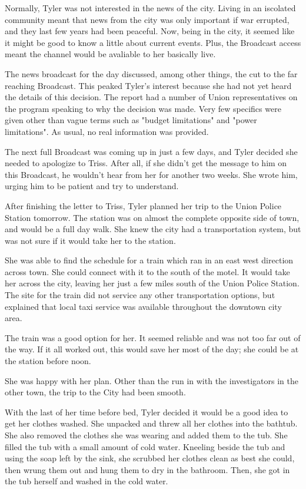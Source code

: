 \documentclass[courier]{sffms}
\begin{document}
Normally, Tyler was not interested in the news of
the city. Living in an iscolated community meant
that news from the city was only important if war
errupted, and they last few years had been peaceful.
Now, being in the city, it seemed like it might be
good to know a little about current events. Plus,
the Broadcast access meant the channel would be
avaliable to her basically live.

The news broadcast for the day discussed, among
other things, the cut to the far reaching Broadcast.
This peaked Tyler's interest because she had not
yet heard the details of this decision. The report had
a number of Union representatives on the program
speaking to why the decision was made. Very few
specifics were given other than vague terms such as
"budget limitations" and "power limitations". As
usual, no real information was provided.

The next full Broadcast was coming up in just a few
days, and Tyler decided she needed to apologize to
Triss. After all, if she didn't get the
message to him on this Broadcast, he wouldn't
hear from her for another two weeks. She wrote him,
urging him to be patient and try to understand.

After finishing the letter to Triss, Tyler planned her
trip to the Union Police Station tomorrow. The station
was on almost the complete opposite side of town,
and would be a full day walk. She knew the city had
a transportation system, but was not sure if it would
take her to the station.

She was able to find the schedule for a train which
ran in an east west direction across town. She could
connect with it to the south of the motel. It would take
her across the city, leaving her just a few miles
south of the Union Police Station. The site for the
train did not service any other transportation options,
but explained that local taxi service was available
throughout the downtown city area.

The train was a good option for her. It seemed reliable
and was not too far out of the way. If it all worked out,
this would save her most of the day; she could be at the
station before noon.

She was happy with her plan. Other than the run in with
the investigators in the other town, the trip to the City
had been smooth.

With the last of her time before bed, Tyler decided it would
be a good idea to get her clothes washed. She unpacked
and threw all her clothes into the bathtub. She also removed
the clothes she was wearing and
added them to the tub. She filled the
tub with a small amount of cold water. Kneeling beside the
tub and using the soap
left by the sink, she scrubbed her clothes clean as best she
could, then wrung them out and hung them to dry in the
bathroom. Then, she got in the tub herself and washed
in the cold water.
\end{document}

